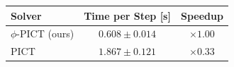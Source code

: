 \begin{tabular}{lcc}
\toprule
Solver & Time per Step [s] & Speedup \\
\midrule
$\phi$-PICT (ours) & $0.608 \pm 0.014$ & $\times1.00$ \\
PICT & $1.867 \pm 0.121$ & $\times0.33$ \\
\bottomrule
\end{tabular}

